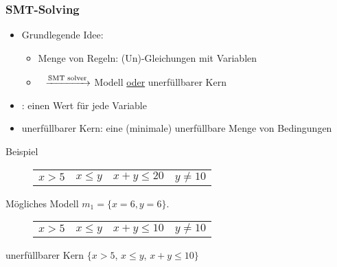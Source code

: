 \begin{frame}
	\frametitle{\color{white}SMT-Solving}
	
	\begin{itemize}
		\item Grundlegende Idee: 
			\begin{itemize}
				\item[] Menge von Regeln: (Un)-Gleichungen mit Variablen
				\item[] \qquad$\>\>$ $\xrightarrow{\text{SMT solver}}$ Modell \underline{oder} unerf\"ullbarer Kern
			\end{itemize}		
		\item {}: einen Wert f\"ur jede Variable
		\item \color{blue}unerf\"ullbarer Kern\color{black}: eine (minimale) unerf\"ullbare Menge von Bedingungen
	\end{itemize}
	\begin{exampleblock}{Beispiel}
		\begin{figure}[H]
			\centering
			\begin{tabular}{cccc}
				$x > 5 $ & $x \le y$ & $ x+ y \le 20$ &$y \neq 10$ \\
			\end{tabular}
		\end{figure}
		M\"ogliches Modell $m_1 = \{x=6, y=6\}$.
		\begin{figure}[H]
			\centering
			\begin{tabular}{cccc}
				$x > 5 $ & $x \le y$ & $ x+ y \le 10$ &$y \neq 10$ \\
			\end{tabular}
		\end{figure}
		unerf\"ullbarer Kern $\{x > 5$, $x \le y$,  $x+ y \le 10 \}$
	\end{exampleblock}
\end{frame}